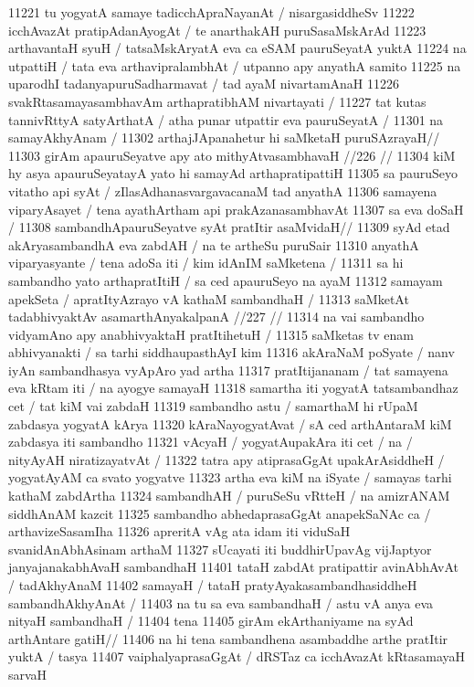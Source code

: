 11221 tu yogyatA samaye tadicchApraNayanAt / nisargasiddheSv  
11222 icchAvazAt pratipAdanAyogAt / te anarthakAH puruSasaMskArAd 
11223 arthavantaH syuH / tatsaMskAryatA eva ca eSAM pauruSeyatA yuktA  
11224 na utpattiH / tata eva arthavipralambhAt / utpanno apy anyathA samito  
11225 na uparodhI tadanyapuruSadharmavat / tad ayaM nivartamAnaH 
11226 svakRtasamayasambhavAm arthapratibhAM nivartayati /  
11227 tat kutas tannivRttyA satyArthatA / atha punar utpattir eva pauruSeyatA /
11301 na samayAkhyAnam / 
11302 	arthajJApanahetur hi saMketaH puruSAzrayaH// 
11303 	girAm apauruSeyatve apy ato mithyAtvasambhavaH //226 //
11304 kiM hy asya apauruSeyatayA yato hi samayAd arthapratipattiH
11305 sa pauruSeyo vitatho api syAt / zIlasAdhanasvargavacanaM tad anyathA
11306 samayena viparyAsayet / tena ayathArtham api prakAzanasambhavAt
11307 sa eva doSaH /
11308 	sambandhApauruSeyatve syAt pratItir asaMvidaH//
11309 syAd etad akAryasambandhA eva zabdAH / na te artheSu puruSair  
11310 anyathA viparyasyante / tena adoSa iti / kim idAnIM saMketena /  
11311 sa hi sambandho yato arthapratItiH / sa ced apauruSeyo na ayaM 
11312 samayam apekSeta / apratItyAzrayo vA kathaM sambandhaH /  
11313 	saMketAt tadabhivyaktAv asamarthAnyakalpanA //227 //  
11314 na vai sambandho vidyamAno apy anabhivyaktaH pratItihetuH /
11315 saMketas tv enam abhivyanakti / sa tarhi siddhaupasthAyI kim  
11316 akAraNaM poSyate / nanv iyAn sambandhasya vyApAro yad artha 
11317 pratItijananam / tat samayena eva kRtam iti / na ayogye samayaH
11318 samartha iti yogyatA tatsambandhaz cet / tat kiM vai zabdaH 
11319 sambandho astu / samarthaM hi rUpaM zabdasya yogyatA kArya
11320 kAraNayogyatAvat / sA ced arthAntaraM kiM zabdasya iti sambandho
11321 vAcyaH / yogyatAupakAra iti cet / na / nityAyAH niratizayatvAt /
11322 tatra apy atiprasaGgAt upakArAsiddheH / yogyatAyAM ca svato yogyatve
11323 artha eva kiM na iSyate / samayas tarhi kathaM zabdArtha
11324 sambandhAH / puruSeSu vRtteH / na amizrANAM siddhAnAM kazcit
11325 sambandho abhedaprasaGgAt anapekSaNAc ca / arthavizeSasamIha 
11326 apreritA vAg ata idam iti viduSaH svanidAnAbhAsinam arthaM  
11327 sUcayati iti buddhirUpavAg vijJaptyor janyajanakabhAvaH sambandhaH  
11401 tataH zabdAt pratipattir avinAbhAvAt / tadAkhyAnaM  
11402 samayaH / tataH pratyAyakasambandhasiddheH sambandhAkhyAnAt /  
11403 na tu sa eva sambandhaH / astu vA anya eva nityaH sambandhaH /  
11404 tena 
11405 	girAm ekArthaniyame na syAd arthAntare gatiH// 
11406 na hi tena sambandhena asambaddhe arthe pratItir yuktA / tasya 
11407 vaiphalyaprasaGgAt / dRSTaz ca icchAvazAt kRtasamayaH sarvaH  
